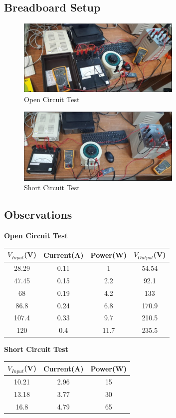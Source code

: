 \documentclass{article}
\begin{document}
\subsection{Breadboard Setup}
\begin{figure}[h!]
    \centering
    \includegraphics[width=0.7\textwidth]{img3.png}
    \caption{Open Circuit Test}
\end{figure}
\begin{figure}[h!]
    \centering
    \includegraphics[width=0.7\textwidth]{img4.png}
    \caption{Short Circuit Test}
\end{figure}
\subsection{Observations}
\begin{center}
\textbf{Open Circuit Test}\\\vspace{2mm}
\begin{tabular}{|c|c|c|c|}
\hline
    $V_{Input}$(V) & Current(A) & Power(W) & $V_{Output}$(V) \\
    \hline
    28.29 & 0.11 & 1 & 54.54\\
    47.45 & 0.15 & 2.2 & 92.1\\
    68 & 0.19 & 4.2 & 133\\
    86.8 & 0.24 & 6.8 & 170.9\\
    107.4 & 0.33 & 9.7 & 210.5\\
    120 & 0.4 & 11.7 & 235.5\\
\hline
\end{tabular}
\newpage
\textbf{Short Circuit Test}\\\vspace{2mm}
\begin{tabular}{|c|c|c|}
\hline
    $V_{Input}$(V) & Current(A) & Power(W)\\
    \hline
    10.21 & 2.96 & 15 \\
    13.18 & 3.77 & 30\\
    16.8 & 4.79 & 65\\
\hline
\end{tabular}
\end{center}
\end{document}
